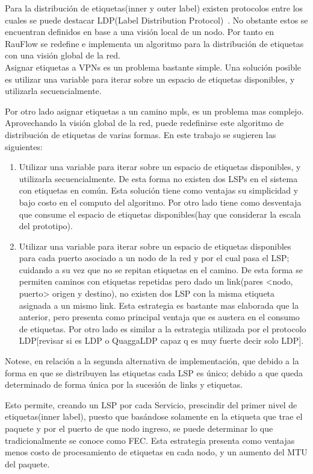 Para la distribución de etiquetas(inner y outer label) existen protocolos entre los cuales se puede destacar LDP(Label Distribution Protocol)~\citep{LDPRFC}. No obstante estos se encuentran definidos en base a una visión local de un nodo. Por tanto en RauFlow se redefine e implementa un algoritmo para la distribución de etiquetas con una visión global de la red.\\

Asignar etiquetas a VPNs es un problema bastante simple. Una  solución posible es utilizar una variable para iterar sobre un espacio de etiquetas disponibles, y utilizarla secuencialmente.  

Por otro lado asignar etiquetas a un camino mpls, es un problema mas complejo. Aprovechando la visión global de la red, puede redefinirse este algoritmo de distribución de etiquetas de varias formas. En este trabajo se sugieren las siguientes:

\begin{enumerate}
\item Utilizar una variable para iterar sobre un espacio de etiquetas disponibles, y utilizarla secuencialmente. De esta forma no existen dos LSPs en el sistema con etiquetas en com\'un. Esta solución tiene como ventajas su simplicidad y bajo costo en el computo del algoritmo. Por otro lado tiene como desventaja que consume el espacio de etiquetas disponibles(hay que considerar la escala del prototipo).

\item Utilizar una variable para iterar sobre un espacio de etiquetas disponibles para cada puerto asociado a un nodo de la red y por el cual pasa el LSP; cuidando a su vez que no se repitan etiquetas en el camino. De esta forma se permiten caminos con etiquetas repetidas pero dado un link(pares <nodo, puerto> origen y destino), no existen dos LSP con la misma etiqueta asignada a un mismo link. Esta estrategia es bastante mas elaborada que la anterior, pero presenta como principal ventaja que es austera en el consumo de etiquetas. Por otro lado es similar a la estrategia utilizada por el protocolo LDP[revisar si es LDP o QuaggaLDP capaz q es muy fuerte decir solo LDP].
\end{enumerate}

Notese, en relación a la segunda alternativa de implementaci\'on, que debido a la forma en que se distribuyen las etiquetas cada LSP es único; debido a que queda determinado de forma única por la sucesión de links y etiquetas. 

Esto permite, creando un LSP por cada Servicio, prescindir del primer nivel de etiquetas(inner label), puesto que basándose solamente en la etiqueta que trae el paquete y por el puerto de que nodo ingreso, se puede determinar lo que tradicionalmente se conoce como FEC. Esta estrategia presenta como ventajas menos costo de procesamiento de etiquetas en cada nodo, y un aumento del MTU del paquete.\\

